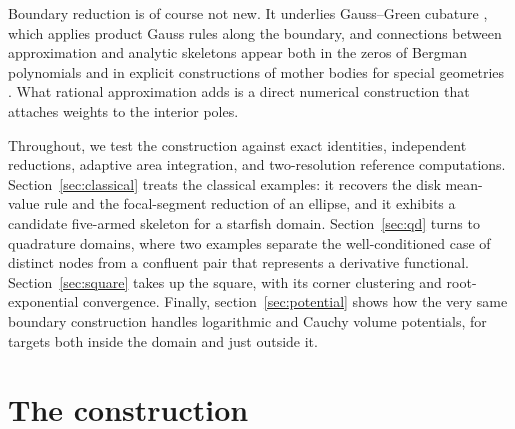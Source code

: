\documentclass[onefignum,onetabnum]{siamart220329}
\begin{document}
Boundary reduction is of course not new. It underlies Gauss--Green
cubature \cite{SommarivaVianello2009}, which applies product Gauss
rules along the boundary, and connections between approximation and
analytic skeletons appear both in the zeros of Bergman polynomials
\cite{GPSS2009} and in explicit constructions of mother bodies for
special geometries \cite{Gustafsson1998,SavinaSterninShatalov2005}.
What rational approximation adds is a direct numerical construction that
attaches weights to the interior poles.

Throughout, we test the construction against exact identities,
independent reductions, adaptive area integration, and two-resolution
reference computations. Section~\ref{sec:classical} treats the
classical examples: it recovers the disk mean-value rule and the
focal-segment reduction of an ellipse, and it exhibits a candidate
five-armed skeleton for a starfish domain. Section~\ref{sec:qd} turns
to quadrature domains, where two examples separate the well-conditioned
case of distinct nodes from a confluent pair that represents a
derivative functional. Section~\ref{sec:square} takes up the square,
with its corner clustering and root-exponential convergence. Finally,
section~\ref{sec:potential} shows how the very same boundary
construction handles logarithmic and Cauchy volume potentials, for
targets both inside the domain and just outside it.


\section{The construction}
\label{sec:construction}
\end{document}
